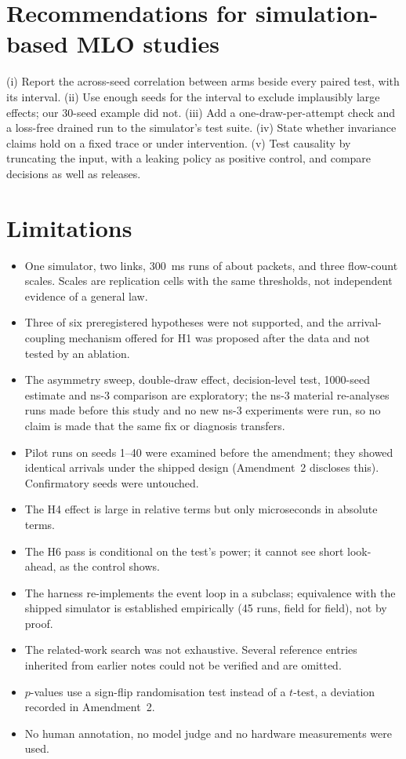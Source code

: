 \documentclass[11pt]{article}
\begin{document}
\section{Recommendations for simulation-based MLO studies}
(i) Report the across-seed correlation between arms beside every paired test, with its interval. (ii) Use enough seeds for the interval to exclude implausibly large effects; our 30-seed example did not. (iii) Add a one-draw-per-attempt check and a loss-free drained run to the simulator's test suite. (iv) State whether invariance claims hold on a fixed trace or under intervention. (v) Test causality by truncating the input, with a leaking policy as positive control, and compare decisions as well as releases.

\section{Limitations}
\begin{itemize}
  \item One simulator, two links, 300~ms runs of about \GenPerRun{} packets, and three flow-count scales. Scales are replication cells with the same thresholds, not independent evidence of a general law.
  \item Three of six preregistered hypotheses were not supported, and the arrival-coupling mechanism offered for H1 was proposed after the data and not tested by an ablation.
  \item The asymmetry sweep, double-draw effect, decision-level test, 1000-seed estimate and ns-3 comparison are exploratory; the ns-3 material re-analyses runs made before this study and no new ns-3 experiments were run, so no claim is made that the same fix or diagnosis transfers.
  \item Pilot runs on seeds 1--40 were examined before the amendment; they showed identical arrivals under the shipped design (Amendment~2 discloses this). Confirmatory seeds were untouched.
  \item The H4 effect is large in relative terms but only microseconds in absolute terms.
  \item The H6 pass is conditional on the test's power; it cannot see short look-ahead, as the control shows.
  \item The harness re-implements the event loop in a subclass; equivalence with the shipped simulator is established empirically (45 runs, field for field), not by proof.
  \item The related-work search was not exhaustive. Several reference entries inherited from earlier notes could not be verified and are omitted.
  \item $p$-values use a sign-flip randomisation test instead of a $t$-test, a deviation recorded in Amendment~2.
  \item No human annotation, no model judge and no hardware measurements were used.
\end{itemize}
\end{document}
